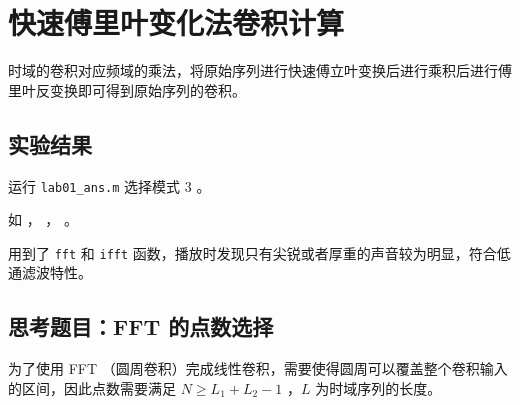 \documentclass[lang=cn,11pt,a4paper,cite=authoryear]{elegantpaper}
\begin{document}

\section{快速傅里叶变化法卷积计算}

时域的卷积对应频域的乘法，将原始序列进行快速傅立叶变换后进行乘积后进行傅里叶反变换即可得到原始序列的卷积。


\subsection{实验结果}

运行 \lstinline{lab01_ans.m} 选择模式 3 。

如 ， ，  。





用到了 \lstinline{fft} 和 \lstinline{ifft} 函数，播放时发现只有尖锐或者厚重的声音较为明显，符合低通滤波特性。

\subsection{思考题目：FFT 的点数选择}

为了使用 FFT （圆周卷积）完成线性卷积，需要使得圆周可以覆盖整个卷积输入的区间，因此点数需要满足 \(N \ge L_1 + L_2 - 1\) ，\(L\) 为时域序列的长度。
\end{document}
